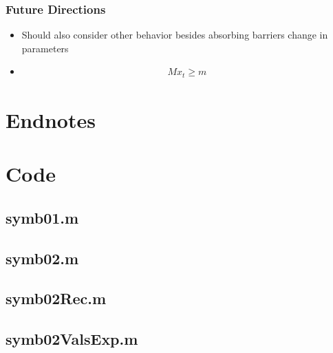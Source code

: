 \documentclass{beamer}
\begin{document}
   \begin{frame}
     \frametitle{Future Directions}
     \begin{itemize}
     \item Should also consider other behavior besides absorbing barriers change in parameters
     \item  \begin{gather*}
 M x_t \ge m  
 \end{gather*} 

     \end{itemize}
   \end{frame}


   \begin{frame}
 
 
     
   \end{frame}


     \section{Endnotes}
{\tiny
     \theendnotes
}





\section{Code}
\begin{frame}
\label{sec:code}
\end{frame}
\subsection{symb01.m}

\begin{frame}
\label{sec:symb01.m}
\end{frame}



\newpage
\subsection{symb02.m}

\begin{frame}
\label{sec:symb02.m}  
\end{frame}


\newpage
\subsection{symb02Rec.m}
\begin{frame}
\label{sec:symb02Rec.m}  
\end{frame}



\newpage
\subsection{symb02ValsExp.m}
\begin{frame}
\label{sec:symb02ValsExp.m}
\end{frame}
\end{document}
